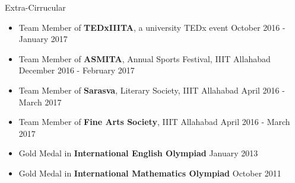 \documentclass{resume} %
\begin{document}

\begin{rSection}{Extra-Cirrucular} \itemsep -2pt   

\begin{itemize}
 
\item Team Member of \textbf{TEDxIIITA}, a university TEDx event \hfill October 2016 - January 2017
\item Team Member of \textbf{ASMITA}, Annual Sports Festival, IIIT Allahabad  
\hfill December 2016 - February 2017
\item Team Member of \textbf{Sarasva}, Literary Society, IIIT Allahabad \hfill April 2016 - March 2017
\item Team Member of \textbf{Fine Arts Society}, IIIT Allahabad \hfill April 2016 - March 2017
\item Gold Medal in \textbf{International English Olympiad} \hfill January 2013
\item  Gold Medal in \textbf{International Mathematics Olympiad} \hfill October 2011 
  
\end{itemize}  


\end{rSection} 

\end{document}
